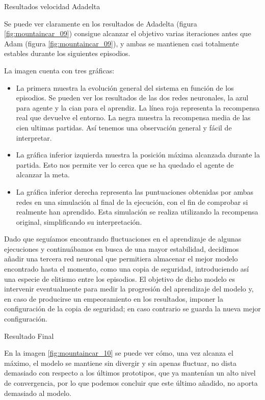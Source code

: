 %
       {Resultados velocidad Adadelta}

Se puede ver claramente en los resultados de Adadelta (figura \ref{fig:mountaincar_09}) consigue alcanzar el objetivo varias iteraciones antes que Adam (figura \ref{fig:mountaincar_09}), y ambas se mantienen casi totalmente estables durante los siguientes episodios.

La imagen cuenta con tres gráficas:
\begin{itemize}
    \item La primera muestra la evolución general del sistema en función de los episodios. Se pueden ver los resultados de las dos redes neuronales, la azul para agente y la cian para el aprendiz. La línea roja representa la recompensa real que devuelve el entorno. La negra muestra la recompensa media de las cien ultimas partidas. Así tenemos una observación general y fácil de interpretar.
    \item La gráfica inferior izquierda muestra la posición máxima alcanzada durante la partida. Esto nos permite ver lo cerca que se ha quedado el agente de alcanzar la meta.
    \item La gráfica inferior derecha representa las puntuaciones obtenidas por ambas redes en una simulación al final de la ejecución, con el fin de comprobar si realmente han aprendido. Esta simulación se realiza utilizando la recompensa original, simplificando su interpretación.  
\end{itemize}

Dado que seguíamos encontrando fluctuaciones en el aprendizaje de algunas ejecuciones y continuábamos en busca de una mayor estabilidad, decidimos añadir una tercera red neuronal que permitiera almacenar el mejor modelo encontrado hasta el momento, como una copia de seguridad, introduciendo así una especie de elitismo entre los episodios. El objetivo de dicho modelo es intervenir eventualmente para medir la progresión del aprendizaje del modelo y, en caso de producirse un empeoramiento en los resultados, imponer la configuración de la copia de seguridad; en caso contrario se guarda la nueva mejor configuración. 

%
       {Resultado Final}

En la imagen \ref{fig:mountaincar_10} se puede ver cómo, una vez alcanza el máximo, el modelo se mantiene sin divergir y sin apenas fluctuar, no dista demasiado con respecto a los últimos prototipos, que ya mantenían un alto nivel de convergencia, por lo que podemos concluir que este último añadido, no aporta demasiado al modelo. 

